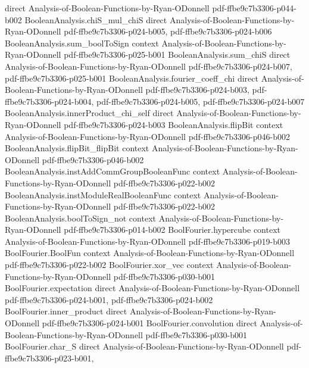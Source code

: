 \begin{lemma}
  {direct}
  {Analysis-of-Boolean-Functions-by-Ryan-ODonnell}
  {pdf-ffbe9c7b3306-p044-b002}
\proofstep
  {BooleanAnalysis.chiS_mul_chiS}
  {direct}
  {Analysis-of-Boolean-Functions-by-Ryan-ODonnell}
  {pdf-ffbe9c7b3306-p024-b005,
    pdf-ffbe9c7b3306-p024-b006}
\proofstep
  {BooleanAnalysis.sum_boolToSign}
  {context}
  {Analysis-of-Boolean-Functions-by-Ryan-ODonnell}
  {pdf-ffbe9c7b3306-p025-b001}
\proofstep
  {BooleanAnalysis.sum_chiS}
  {direct}
  {Analysis-of-Boolean-Functions-by-Ryan-ODonnell}
  {pdf-ffbe9c7b3306-p024-b007,
    pdf-ffbe9c7b3306-p025-b001}
\proofstep
  {BooleanAnalysis.fourier_coeff_chi}
  {direct}
  {Analysis-of-Boolean-Functions-by-Ryan-ODonnell}
  {pdf-ffbe9c7b3306-p024-b003,
    pdf-ffbe9c7b3306-p024-b004,
    pdf-ffbe9c7b3306-p024-b005,
    pdf-ffbe9c7b3306-p024-b007}
\proofstep
  {BooleanAnalysis.innerProduct_chi_self}
  {direct}
  {Analysis-of-Boolean-Functions-by-Ryan-ODonnell}
  {pdf-ffbe9c7b3306-p024-b003}
\proofstep
  {BooleanAnalysis.flipBit}
  {context}
  {Analysis-of-Boolean-Functions-by-Ryan-ODonnell}
  {pdf-ffbe9c7b3306-p046-b002}
\proofstep
  {BooleanAnalysis.flipBit_flipBit}
  {context}
  {Analysis-of-Boolean-Functions-by-Ryan-ODonnell}
  {pdf-ffbe9c7b3306-p046-b002}
\proofstep
  {BooleanAnalysis.instAddCommGroupBooleanFunc}
  {context}
  {Analysis-of-Boolean-Functions-by-Ryan-ODonnell}
  {pdf-ffbe9c7b3306-p022-b002}
\proofstep
  {BooleanAnalysis.instModuleRealBooleanFunc}
  {context}
  {Analysis-of-Boolean-Functions-by-Ryan-ODonnell}
  {pdf-ffbe9c7b3306-p022-b002}
\proofstep
  {BooleanAnalysis.boolToSign_not}
  {context}
  {Analysis-of-Boolean-Functions-by-Ryan-ODonnell}
  {pdf-ffbe9c7b3306-p014-b002}
\proofstep
  {BoolFourier.hypercube}
  {context}
  {Analysis-of-Boolean-Functions-by-Ryan-ODonnell}
  {pdf-ffbe9c7b3306-p019-b003}
\proofstep
  {BoolFourier.BoolFun}
  {context}
  {Analysis-of-Boolean-Functions-by-Ryan-ODonnell}
  {pdf-ffbe9c7b3306-p022-b002}
\proofstep
  {BoolFourier.xor_vec}
  {context}
  {Analysis-of-Boolean-Functions-by-Ryan-ODonnell}
  {pdf-ffbe9c7b3306-p030-b001}
\proofstep
  {BoolFourier.expectation}
  {direct}
  {Analysis-of-Boolean-Functions-by-Ryan-ODonnell}
  {pdf-ffbe9c7b3306-p024-b001,
    pdf-ffbe9c7b3306-p024-b002}
\proofstep
  {BoolFourier.inner_product}
  {direct}
  {Analysis-of-Boolean-Functions-by-Ryan-ODonnell}
  {pdf-ffbe9c7b3306-p024-b001}
\proofstep
  {BoolFourier.convolution}
  {direct}
  {Analysis-of-Boolean-Functions-by-Ryan-ODonnell}
  {pdf-ffbe9c7b3306-p030-b001}
\proofstep
  {BoolFourier.char_S}
  {direct}
  {Analysis-of-Boolean-Functions-by-Ryan-ODonnell}
  {pdf-ffbe9c7b3306-p023-b001,
}
\end{lemma}

